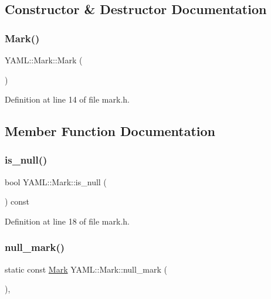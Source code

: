 \subsection{Constructor \& Destructor Documentation}
\mbox{\label{struct_y_a_m_l_1_1_mark_a136aceca957797716dc3fe249cfb21ec}} 
\subsubsection{\texorpdfstring{Mark()}{Mark()}}
{\footnotesize\ttfamily Y\+A\+M\+L\+::\+Mark\+::\+Mark (\begin{DoxyParamCaption}{ }\end{DoxyParamCaption})\hspace{0.3cm}{\ttfamily [inline]}}



Definition at line 14 of file mark.\+h.



\subsection{Member Function Documentation}
\mbox{\label{struct_y_a_m_l_1_1_mark_a914cc14d3bc21226285ca9ce31ef07fc}} 
\subsubsection{\texorpdfstring{is\_null()}{is\_null()}}
{\footnotesize\ttfamily bool Y\+A\+M\+L\+::\+Mark\+::is\+\_\+null (\begin{DoxyParamCaption}{ }\end{DoxyParamCaption}) const\hspace{0.3cm}{\ttfamily [inline]}}



Definition at line 18 of file mark.\+h.

\mbox{\label{struct_y_a_m_l_1_1_mark_a915b7cb23c5fb28a1f2095ce3426f15e}} 
\subsubsection{\texorpdfstring{null\_mark()}{null\_mark()}}
{\footnotesize\ttfamily static const \mbox{\hyperlink{struct_y_a_m_l_1_1_mark}{Mark}} Y\+A\+M\+L\+::\+Mark\+::null\+\_\+mark (\begin{DoxyParamCaption}{ }\end{DoxyParamCaption})\hspace{0.3cm}{\ttfamily [inline]}, {\ttfamily [static]}}



